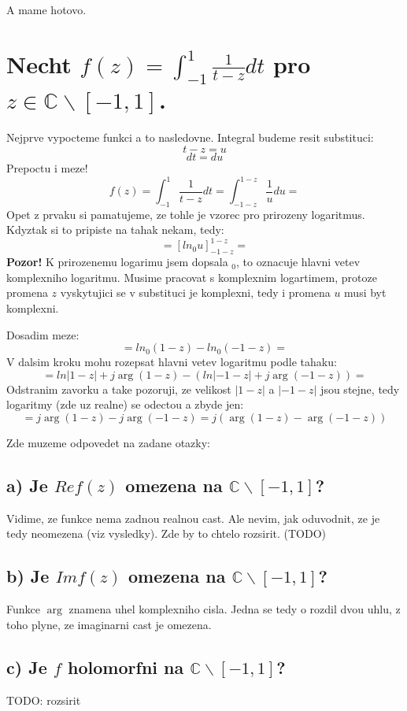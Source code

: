 A mame hotovo.

\newpage

\section{Necht $f(z) = \int_{-1}^1 \frac{1}{t-z} dt$ pro $z \in \mathbb{C} \backslash [-1,1]$.}

Nejprve vypocteme funkci a to nasledovne. Integral budeme resit substituci:
$$t-z = u$$
$$dt = du$$
Prepoctu i meze!
$$f(z) = \int_{-1}^1 \frac{1}{t-z} dt = \int_{-1-z}^{1-z} \frac{1}{u} du =$$
Opet z prvaku si pamatujeme, ze tohle je vzorec pro prirozeny logaritmus. Kdyztak si to pripiste na tahak nekam, tedy:
$$ = \left[ ln_0 u \right]_{-1-z}^{1-z} =$$
\textbf{Pozor!} K prirozenemu logarimu jsem dopsala $_0$, to oznacuje hlavni vetev komplexniho logaritmu. Musime pracovat s komplexnim logartimem, protoze promena $z$ vyskytujici se v substituci je komplexni, tedy i promena $u$ musi byt komplexni.

Dosadim meze:
$$ = ln_0(1-z) - ln_0 (-1-z) = $$
V dalsim kroku mohu rozepsat hlavni vetev logaritmu podle tahaku:
$$ = ln |1-z| + j \operatorname{arg}(1-z) - (ln|-1-z| + j \operatorname{arg}(-1-z)) = $$
Odstranim zavorku a take pozoruji, ze velikost $|1-z|$ a $|-1-z|$ jsou stejne, tedy logaritmy (zde uz realne) se odectou a zbyde jen:
$$ = j \operatorname{arg}(1-z) -j \operatorname{arg}(-1-z) = j (\operatorname{arg}(1-z)- \operatorname{arg}(-1-z))$$

Zde muzeme odpovedet na zadane otazky:

\subsection{a) Je $Re f(z)$ omezena na $\mathbb{C} \backslash [-1,1]$?}
Vidime, ze funkce nema zadnou realnou cast. Ale nevim, jak oduvodnit, ze je tedy neomezena (viz vysledky). Zde by to chtelo rozsirit. (TODO)

\subsection{b) Je $Im f(z)$ omezena na $\mathbb{C} \backslash [-1,1]$?}

Funkce $\operatorname{arg}$ znamena uhel komplexniho cisla. Jedna se tedy o rozdil dvou uhlu, z toho plyne, ze imaginarni cast je omezena.

\subsection{c) Je $f$ holomorfni na $\mathbb{C} \backslash [-1,1]$?}

TODO: rozsirit

